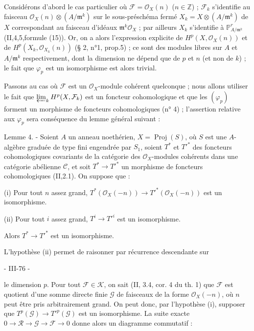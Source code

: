 Considérons d'abord le cas particulier où $\mathcal{F} = \mathcal{O}_X(n)$ ($n \in \mathbb{Z}$) ; $\mathcal{F}_k$ s'identifie au faisceau $\mathcal{O}_X(n) \otimes (A/\mathfrak{m}^k)$ sur le sous-préschéma fermé $X_k = X \otimes (A/\mathfrak{m}^k)$ de $X$ correspondant au faisceau d'idéaux $\mathfrak{m}^k\mathcal{O}_X$ ; par ailleurs $X_k$ s'identifie à $\mathbb{P}^r_{A/\mathfrak{m}^k}$ (II,4,5,formule (15)). Or, on a alors l'expression explicite de $H^p(X, \mathcal{O}_X(n))$ et de $H^p(X_k, \mathcal{O}_{X_k}(n))$ (§ 2, n°1, prop.5) ; ce sont des modules libres sur $A$ et $A/\mathfrak{m}^k$ respectivement, dont la dimension ne dépend que de $p$ et $n$ (et non de $k$) ; le fait que $\varphi_p$ est un isomorphisme est alors trivial.

Passons au cas où $\mathcal{F}$ est un $\mathcal{O}_X$-module cohérent quelconque ; nous allons utiliser le fait que $\varprojlim_k H^p(X, \mathcal{F}_k)$ est un foncteur cohomologique et que les $(\varphi_p)$ forment un morphisme de foncteurs cohomologiques (n° 4) ; l'assertion relative aux $\varphi_p$ sera conséquence du lemme général suivant :

Lemme 4. - Soient $A$ un anneau noethérien, $X = \operatorname{Proj}(S)$, où $S$ est une $A$-algèbre graduée de type fini engendrée par $S_1$, soient $T^*$ et $T'^*$ des foncteurs cohomologiques covariants de la catégorie des $\mathcal{O}_X$-modules cohérents dans une catégorie abélienne $\mathcal{C}$, et soit $T^* \to T'^*$ un morphisme de foncteurs cohomologiques (II,2.1). On suppose que :

(i) Pour tout $n$ assez grand, $T^*( \mathcal{O}_X(-n)) \to T'^*( \mathcal{O}_X(-n))$ est un isomorphisme.

(ii) Pour tout $i$ assez grand, $T^i \to T'^i$ est un isomorphisme.

Alors $T^* \to T'^*$ est un isomorphisme.

L'hypothèse (ii) permet de raisonner par récurrence descendante sur

\newpage


- III-76 -

le dimension $p$. Pour tout $\mathcal{F} \in \mathcal{K}$, on sait (II, 3.4, cor. 4 du th. 1) que $\mathcal{F}$ est quotient d'une somme directe finie $\mathcal{G}$ de faisceaux de la forme $\mathcal{O}_X(-n)$, où $n$ peut être pris arbitrairement grand. On peut donc, par l'hypothèse (i), supposer que $T^p(\mathcal{G}) \to T'^p(\mathcal{G})$ est un isomorphisme. La suite exacte $0 \to \mathcal{R} \to \mathcal{G} \to \mathcal{F} \to 0$ donne alors un diagramme commutatif :

